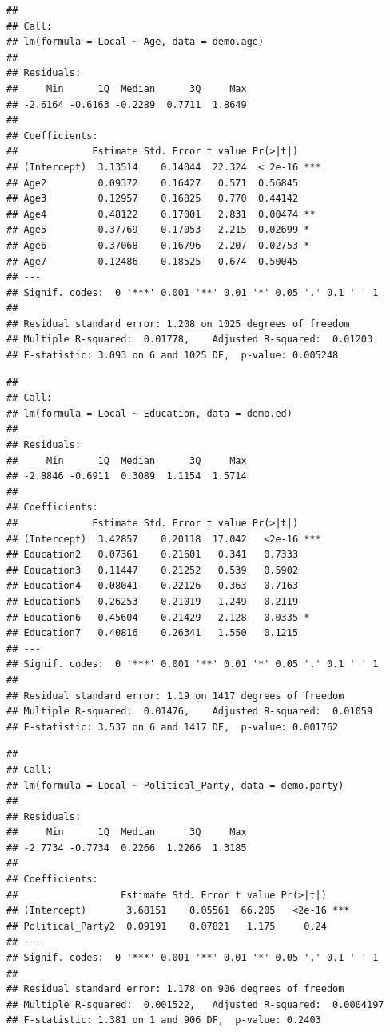 \documentclass[
  12pt,
]{article}
\begin{document}
\begin{verbatim}
## 
## Call:
## lm(formula = Local ~ Age, data = demo.age)
## 
## Residuals:
##     Min      1Q  Median      3Q     Max 
## -2.6164 -0.6163 -0.2289  0.7711  1.8649 
## 
## Coefficients:
##             Estimate Std. Error t value Pr(>|t|)    
## (Intercept)  3.13514    0.14044  22.324  < 2e-16 ***
## Age2         0.09372    0.16427   0.571  0.56845    
## Age3         0.12957    0.16825   0.770  0.44142    
## Age4         0.48122    0.17001   2.831  0.00474 ** 
## Age5         0.37769    0.17053   2.215  0.02699 *  
## Age6         0.37068    0.16796   2.207  0.02753 *  
## Age7         0.12486    0.18525   0.674  0.50045    
## ---
## Signif. codes:  0 '***' 0.001 '**' 0.01 '*' 0.05 '.' 0.1 ' ' 1
## 
## Residual standard error: 1.208 on 1025 degrees of freedom
## Multiple R-squared:  0.01778,    Adjusted R-squared:  0.01203 
## F-statistic: 3.093 on 6 and 1025 DF,  p-value: 0.005248
\end{verbatim}

\begin{verbatim}
## 
## Call:
## lm(formula = Local ~ Education, data = demo.ed)
## 
## Residuals:
##     Min      1Q  Median      3Q     Max 
## -2.8846 -0.6911  0.3089  1.1154  1.5714 
## 
## Coefficients:
##             Estimate Std. Error t value Pr(>|t|)    
## (Intercept)  3.42857    0.20118  17.042   <2e-16 ***
## Education2   0.07361    0.21601   0.341   0.7333    
## Education3   0.11447    0.21252   0.539   0.5902    
## Education4   0.08041    0.22126   0.363   0.7163    
## Education5   0.26253    0.21019   1.249   0.2119    
## Education6   0.45604    0.21429   2.128   0.0335 *  
## Education7   0.40816    0.26341   1.550   0.1215    
## ---
## Signif. codes:  0 '***' 0.001 '**' 0.01 '*' 0.05 '.' 0.1 ' ' 1
## 
## Residual standard error: 1.19 on 1417 degrees of freedom
## Multiple R-squared:  0.01476,    Adjusted R-squared:  0.01059 
## F-statistic: 3.537 on 6 and 1417 DF,  p-value: 0.001762
\end{verbatim}

\begin{verbatim}
## 
## Call:
## lm(formula = Local ~ Political_Party, data = demo.party)
## 
## Residuals:
##     Min      1Q  Median      3Q     Max 
## -2.7734 -0.7734  0.2266  1.2266  1.3185 
## 
## Coefficients:
##                  Estimate Std. Error t value Pr(>|t|)    
## (Intercept)       3.68151    0.05561  66.205   <2e-16 ***
## Political_Party2  0.09191    0.07821   1.175     0.24    
## ---
## Signif. codes:  0 '***' 0.001 '**' 0.01 '*' 0.05 '.' 0.1 ' ' 1
## 
## Residual standard error: 1.178 on 906 degrees of freedom
## Multiple R-squared:  0.001522,   Adjusted R-squared:  0.0004197 
## F-statistic: 1.381 on 1 and 906 DF,  p-value: 0.2403
\end{verbatim}
\end{document}
